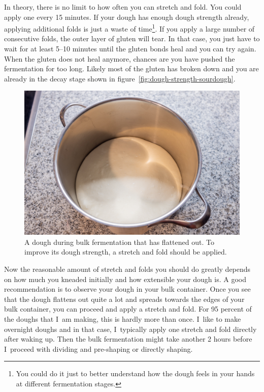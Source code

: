 In theory, there is no limit to how often you can stretch and fold. You could
apply one every 15 minutes. If your dough has enough dough strength already,
applying additional folds is just a waste of time\footnote{You could do it
just to better understand how the dough feels in your hands at different
fermentation stages.}. If you apply a large number of consecutive folds, the
outer layer of gluten
will tear. In that case, you just have to wait for at least 5--10 minutes until
the gluten bonds heal and you can try again. When the gluten does not heal
anymore, chances are you have pushed the fermentation for too long. Likely
most of the gluten has broken down and you are already
in the decay stage shown in figure~\ref{fig:dough-strength-sourdough}.

\begin{figure}[!htb]
  \includegraphics[width=\textwidth]{dough-requiring-stretch-and-fold}
  \caption{A dough during bulk fermentation that has flattened out. To improve
  its dough strength, a stretch and fold should be applied.}
\end{figure}

Now the reasonable amount of stretch and folds you should do greatly depends on how much you
kneaded initially and how extensible your dough is. A good recommendation is
to observe your dough in your bulk container. Once you see that the dough
flattens out quite a lot and spreads towards the edges of your bulk container,
you can proceed and apply a stretch and fold. For 95 percent of the doughs
that I~am making, this is hardly more than once. I~like to make overnight
doughs and in that case, I~typically apply one stretch and fold directly after
waking up. Then the bulk fermentation might take another 2 hours before I~proceed
with dividing and pre-shaping or directly shaping.

